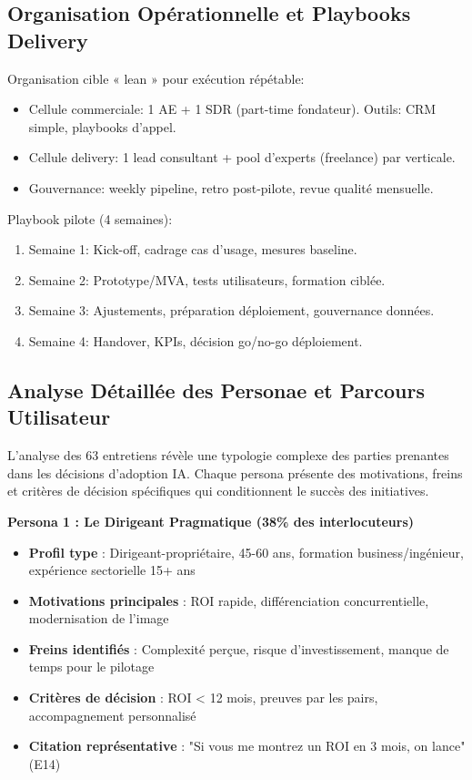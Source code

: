 \subsection{Organisation Opérationnelle et Playbooks Delivery}
Organisation cible « lean » pour exécution répétable:
\begin{itemize}
    \item Cellule commerciale: 1 AE + 1 SDR (part-time fondateur). Outils: CRM simple, playbooks d'appel.
    \item Cellule delivery: 1 lead consultant + pool d'experts (freelance) par verticale.
    \item Gouvernance: weekly pipeline, retro post-pilote, revue qualité mensuelle.
\end{itemize}
Playbook pilote (4 semaines):
\begin{enumerate}
    \item Semaine 1: Kick-off, cadrage cas d'usage, mesures baseline.
    \item Semaine 2: Prototype/MVA, tests utilisateurs, formation ciblée.
    \item Semaine 3: Ajustements, préparation déploiement, gouvernance données.
    \item Semaine 4: Handover, KPIs, décision go/no-go déploiement.
\end{enumerate}

\subsection{Analyse Détaillée des Personae et Parcours Utilisateur}

L'analyse des 63 entretiens révèle une typologie complexe des parties prenantes dans les décisions d'adoption IA. Chaque persona présente des motivations, freins et critères de décision spécifiques qui conditionnent le succès des initiatives.

\textbf{Persona 1 : Le Dirigeant Pragmatique (38\% des interlocuteurs)}
\begin{itemize}
    \item \textbf{Profil type} : Dirigeant-propriétaire, 45-60 ans, formation business/ingénieur, expérience sectorielle 15+ ans
    \item \textbf{Motivations principales} : ROI rapide, différenciation concurrentielle, modernisation de l'image
    \item \textbf{Freins identifiés} : Complexité perçue, risque d'investissement, manque de temps pour le pilotage
    \item \textbf{Critères de décision} : ROI < 12 mois, preuves par les pairs, accompagnement personnalisé
    \item \textbf{Citation représentative} : "Si vous me montrez un ROI en 3 mois, on lance" (E14)
\end{itemize}

